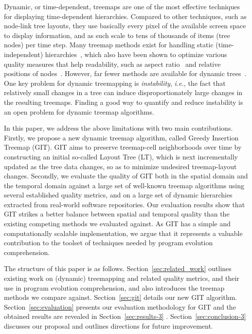 Dynamic, or time-dependent, treemaps are one of the most effective techniques for displaying time-dependent hierarchies. Compared to other techniques, such as node-link tree layouts, they use basically every pixel of the available screen space to display information, and as such scale to tens of thousands of items (tree nodes) per time step. Many treemap methods exist for handling static (time-independent) hierarchies~\citep{shneiderman92,sqr}, which also have been shown to optimize various quality measures that help readability, such as aspect ratio~\citep{sqr, nagamochi07} and relative positions of nodes~\citep{sot,ordered,Ghoniem2015, Buchin2011,nmap}. However, far fewer methods are available for dynamic trees~\citep{hahn10,sondag17,htm}. One key problem for dynamic treemapping is \emph{instability}, \emph{i.e.}, the fact that relatively small changes in a tree can induce disproportionately large changes in the resulting treemaps. Finding a good way to quantify and reduce instability is an open problem for dynamic treemap algorithms.

In this paper, we address the above limitations with two main contributions. Firstly, we propose a new dynamic treemap algorithm, called Greedy Insertion Treemap (GIT). GIT aims to preserve treemap-cell neighborhoods over time by constructing an initial so-called Layout Tree (LT), which is next incrementally updated as the tree data changes, so as to minimize undesired treemap-layout changes.
Secondly, we evaluate the quality of GIT both in the spatial domain and the temporal domain against a large set of well-known treemap algorithms using several established quality metrics, and on a large set of dynamic hierarchies extracted from real-world software repositories. Our evaluation results show that GIT strikes a better balance between spatial and temporal quality than the existing competing methods we evaluated against. As GIT has a simple and computationally scalable implementation, we argue that it represents a valuable contribution to the toolset of techniques needed by program evolution comprehension.

The structure of this paper is as follows. Section~\ref{sec:related_work} outlines existing work on (dynamic) treemapping and related quality metrics, and their use in program evolution comprehension, and also introduces the treemap methods we compare against. Section~\ref{sec:git} details our new GIT algorithm. Section~\ref{sec:evaluation} presents our evaluation methodology for GIT and the obtained results are revealed in Section~\ref{sec:results-3} . Section~\ref{sec:conclusion-3} discusses our proposal and outlines directions for future improvement.



